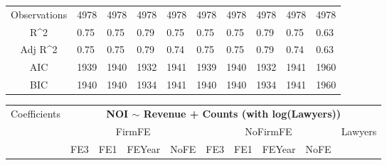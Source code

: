 \documentclass{article}
\begin{document}
\begin{table}[H]
\begin{tabular}{|clllllllll|}
  \hline 
 Observations & 4978 & 4978 & 4978 & 4978 & 4978 & 4978 & 4978 & 4978 & 4978 \\ 
  R^2 & 0.75 & 0.75 & 0.79 & 0.75 & 0.75 & 0.75 & 0.79 & 0.75 & 0.63 \\ 
  Adj R^2 & 0.75 & 0.75 & 0.79 & 0.74 & 0.75 & 0.75 & 0.79 & 0.74 & 0.63 \\ 
  AIC & 1939 & 1940 & 1932 & 1941 & 1939 & 1940 & 1932 & 1941 & 1960 \\ 
  BIC & 1940 & 1940 & 1934 & 1941 & 1940 & 1940 & 1934 & 1941 & 1960 \\ 
   \hline
\end{tabular}
 
\end{table}


\begin{table}[H]
\centering
\begin{tabular}{|clllllllll|}
\hline
\multirow{3}{*}{Coefficients} & \multicolumn{9}{c|}{\textbf{NOI $\sim$ Revenue + Counts (with log(Lawyers))}} \\
\cline{2-10}
& \multicolumn{4}{c}{FirmFE} & \multicolumn{4}{c}{NoFirmFE} & \multirow{2}{*}{Lawyers} \\
\cline{2-9}
& FE3 & FE1 & FEYear & NoFE & FE3 & FE1 & FEYear & NoFE &  \\
\hline
 

\end{tabular}
\end{table}
\end{document}
